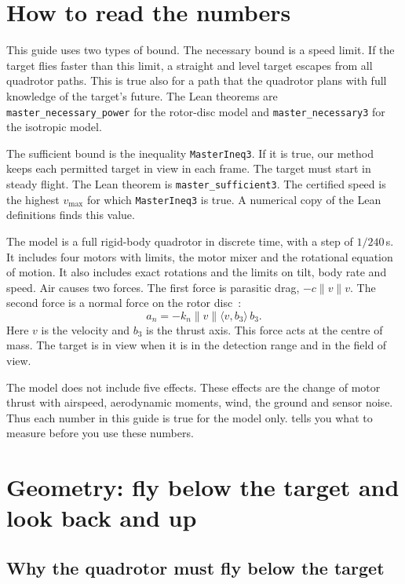 \documentclass[11pt]{article}
\newcommand{\ip}[2]{\langle #1,#2\rangle}
\newcommand{\norm}[1]{\lVert #1\rVert}
\newcommand{\lean}[1]{\texttt{\small #1}}
\begin{document}
\section{How to read the numbers}

This guide uses two types of bound.
The necessary bound is a speed limit.
If the target flies faster than this limit, a straight and level target escapes from all
quadrotor paths.
This is true also for a path that the quadrotor plans with full knowledge of the target's future.
The Lean theorems are \lean{master\_necessary\_power} for the rotor-disc model and
\lean{master\_necessary3} for the isotropic model.

The sufficient bound is the inequality \lean{MasterIneq3}.
If it is true, our method keeps each permitted target in view in each frame.
The target must start in steady flight.
The Lean theorem is \lean{master\_sufficient3}.
The certified speed is the highest $v_{\max}$ for which \lean{MasterIneq3} is true.
A numerical copy of the Lean definitions finds this value.

The model is a full rigid-body quadrotor in discrete time, with a step of $1/240$\,s.
It includes four motors with limits, the motor mixer and the rotational equation of motion.
It also includes exact rotations and the limits on tilt, body rate and speed.
Air causes two forces.
The first force is parasitic drag, $-c\norm v v$.
The second force is a normal force on the rotor disc~\cite{hoffmann2007,faessler2018}:
\begin{equation}
  a_n = -k_n \norm v \ip{v}{b_3}\, b_3 .
\end{equation}
Here $v$ is the velocity and $b_3$ is the thrust axis.
This force acts at the centre of mass.
The target is in view when it is in the detection range and in the field of view.

The model does not include five effects.
These effects are the change of motor thrust with airspeed, aerodynamic moments, wind, the ground
and sensor noise.
Thus each number in this guide is true for the model only.
 tells you what to measure before you use these numbers.

\section{Geometry: fly below the target and look back and up}
\label{sec:geometry}

\subsection{Why the quadrotor must fly below the target}
\end{document}
